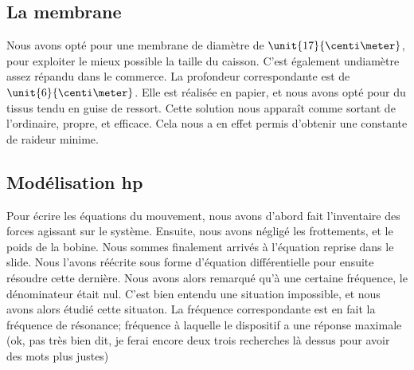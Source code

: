 \subsection{La membrane}
Nous avons opté pour une membrane de diamètre de $\unit{17}{\centi\meter}$, pour exploiter le mieux possible la taille du
caisson. C'est également undiamètre assez répandu dans le commerce. La profondeur correspondante est de $\unit{6}{\centi\meter}$.
Elle est réalisée en papier, et nous avons opté pour du tissus tendu en guise de ressort. Cette solution nous apparaît comme
sortant de l'ordinaire, propre, et efficace. Cela nous a en effet permis d'obtenir une constante de raideur minime.

\subsection{Modélisation hp}

Pour écrire les équations du mouvement, nous avons d'abord fait l'inventaire des forces agissant sur le système. Ensuite, nous
avons négligé les frottements, et le poids de la bobine. Nous sommes finalement arrivés à l'équation reprise dans le slide. 
Nous l'avons réécrite sous forme d'équation différentielle pour ensuite résoudre cette dernière. Nous avons alors remarqué 
qu'à une certaine fréquence, le dénominateur était nul. C'est bien entendu une situation impossible, et nous avons alors
étudié cette situaton. La fréquence correspondante est en fait la fréquence de résonance; fréquence à laquelle le dispositif a
une réponse maximale (ok, pas très bien dit, je ferai encore deux trois recherches là dessus pour avoir des mots plus justes)


